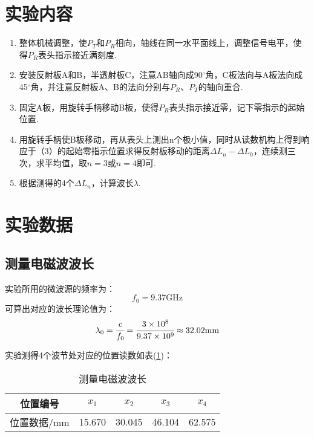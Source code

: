\documentclass[a4paper]{article}
\begin{document}
\section{实验内容}
\begin{enumerate}
\item 整体机械调整，使$P_T$和$P_R$相向，轴线在同一水平面线上，调整信号电平，使得$P_R$表头指示接近满刻度.
\item 安装反射板A和B，半透射板C，注意AB轴向成90$^\circ$角，C板法向与A板法向成45$^\circ$角，并注意反射板A、B的法向分别与$P_R$、$P_T$的轴向重合.
\item 固定A板，用旋转手柄移动B板，使得$P_R$表头指示接近零，记下零指示的起始位置.
\item 用旋转手柄使B板移动，再从表头上测出n个极小值，同时从读数机构上得到响应于（3）的起始零指示位置求得反射板移动的距离$\Delta L_n-\Delta L_0$，连续测三次，求平均值，取$n=3$或$n=4$即可.
\item 根据测得的4个$\Delta L_n$，计算波长$\lambda$.
\end{enumerate}

\section{实验数据}
\subsection{测量电磁波波长}
实验所用的微波源的频率为：
$$f_0 = 9.37\text{GHz}$$
可算出对应的波长理论值为：
\begin{equation}
\lambda_0 = \cfrac{c}{f_0} = \cfrac{3\times 10^8}{9.37\times 10^9} \approx 32.02\text{mm}
\end{equation}

实验测得4个波节处对应的位置读数如表(\ref{lambda})：
\begin{table}[!h]
\centering
\caption{测量电磁波波长}
\label{lambda}
\begin{tabular}{|c|c|c|c|c|}
\hline
位置编号    & $x_1$  & $x_2$  & $x_3$  & $x_4$  \\ \hline
位置数据/mm & 15.670 & 30.045 & 46.104 & 62.575 \\ \hline
\end{tabular}
\end{table}
\end{document}
